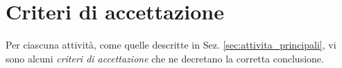 %		
%	
%	
%	

%

\section{Criteri di accettazione}

	Per ciascuna attività, come quelle descritte in Sez. \ref{sec:attivita_principali}, vi sono alcuni \textit{criteri di accettazione} che ne decretano la corretta conclusione.

